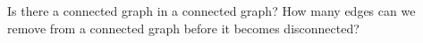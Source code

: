 

Is there a  connected graph in a connected graph?
How many edges can we remove from a connected graph before it becomes disconnected?

